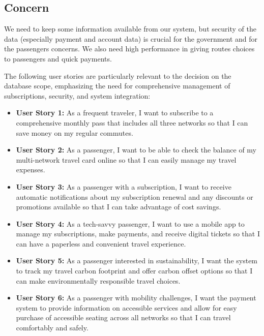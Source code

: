 \subsection*{Concern}
We need to keep some information available from our system, but security of the data (especially payment and account data) is crucial for the government and for the passengers concerns.
We also need high performance in giving routes choices to passengers and quick payments.

The following user stories are particularly relevant to the decision on the database scope, emphasizing the need for comprehensive management of subscriptions, security, and system integration:

\begin{itemize}[noitemsep]
    \item \textbf{User Story 1:} As a frequent traveler, I want to subscribe to a comprehensive monthly pass that includes all three networks so that I can save money on my regular commutes.
    
    \item \textbf{User Story 2:} As a passenger, I want to be able to check the balance of my multi-network travel card online so that I can easily manage my travel expenses.
    
    \item \textbf{User Story 3:} As a passenger with a subscription, I want to receive automatic notifications about my subscription renewal and any discounts or promotions available so that I can take advantage of cost savings. 
    
    \item \textbf{User Story 4:} As a tech-savvy passenger, I want to use a mobile app to manage my subscriptions, make payments, and receive digital tickets so that I can have a paperless and convenient travel experience. 
    
    \item \textbf{User Story 5:} As a passenger interested in sustainability, I want the system to track my travel carbon footprint and offer carbon offset options so that I can make environmentally responsible travel choices.
    
    \item \textbf{User Story 6:} As a passenger with mobility challenges, I want the payment system to provide information on accessible services and allow for easy purchase of accessible seating across all networks so that I can travel comfortably and safely.
    

\end{itemize}
